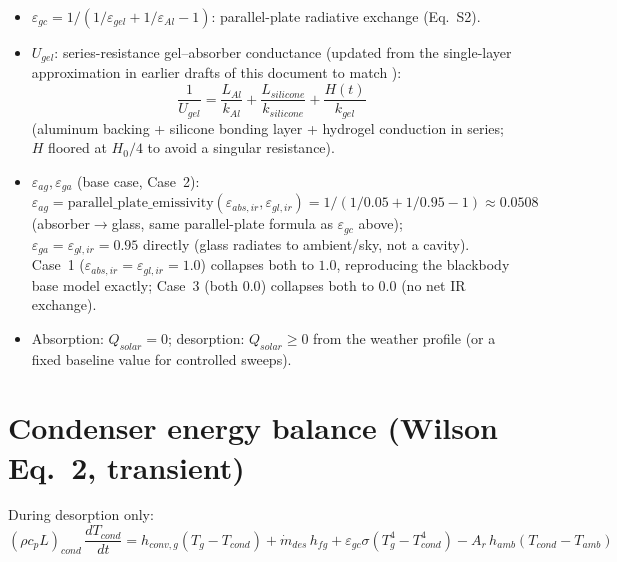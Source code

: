 \documentclass[11pt]{article}
\newcommand{\code}[1]{\texttt{\seqsplit{#1}}}
\begin{document}
\begin{itemize}
paper's field tests were driven by measured horizontal flux with no transposition. The
day/night phase split stays keyed on GHI either way, so phase boundaries are unaffected. Example (Cambridge, summer solstice, 4\,mm gel):
with GHI the mean flux is 595\,W/m$^2$ at every tilt and yield rises monotonically
$0^\circ \to 60^\circ$ (1.882 $\to$ 1.904\,kg/m$^2$) purely via gap convection; with POA the
flux varies (595 $\to$ 449\,W/m$^2$) and yield acquires an interior optimum near
$15^\circ$ (1.927\,kg/m$^2$).
\item $\varepsilon_{gc} = 1/(1/\varepsilon_{gel} + 1/\varepsilon_{Al} - 1)$: parallel-plate
radiative exchange (Eq.~S2).
\item $U_{gel}$: series-resistance gel--absorber conductance (updated from the single-layer
approximation in earlier drafts of this document to match \code{table\_s3.py::u\_gel\_w\_m2\_k}):
\begin{equation}
\frac{1}{U_{gel}} = \frac{L_{Al}}{k_{Al}} + \frac{L_{silicone}}{k_{silicone}} + \frac{H(t)}{k_{gel}}
\label{eq:ugel}
\end{equation}
(aluminum backing + silicone bonding layer + hydrogel conduction in series; $H$ floored at
$H_0/4$ to avoid a singular resistance).
\item $\varepsilon_{ag}, \varepsilon_{ga}$ (base case, Case~2): $\varepsilon_{ag} =
\mathrm{parallel\_plate\_emissivity}(\varepsilon_{abs,ir}, \varepsilon_{gl,ir}) =
1/(1/0.05 + 1/0.95 - 1) \approx 0.0508$ (absorber$\to$glass, same parallel-plate formula as
$\varepsilon_{gc}$ above); $\varepsilon_{ga} = \varepsilon_{gl,ir} = 0.95$ directly (glass radiates
to ambient/sky, not a cavity). Case~1 ($\varepsilon_{abs,ir}=\varepsilon_{gl,ir}=1.0$) collapses
both to $1.0$, reproducing the blackbody base model exactly; Case~3 (both $0.0$) collapses both
to $0.0$ (no net IR exchange).
\item Absorption: $Q_{solar}=0$; desorption: $Q_{solar}\ge 0$ from the weather profile (or a
fixed baseline value for controlled sweeps).
\end{itemize}

\section{Condenser energy balance (Wilson Eq.~2, transient)}

During desorption only:
\begin{equation}
(\rho c_p L)_{cond}\,\frac{dT_{cond}}{dt}
= h_{conv,g}(T_g - T_{cond})
+ \dot{m}_{des}\,h_{fg}
+ \varepsilon_{gc}\sigma(T_g^4 - T_{cond}^4)
- A_r\,h_{amb}(T_{cond} - T_{amb})
\label{eq:condenser}
\end{equation}
\end{document}
